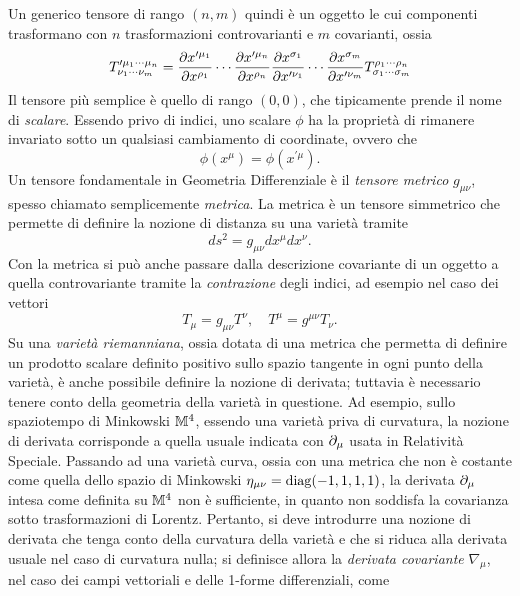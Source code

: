 Un generico tensore di rango $(n,m)$ quindi è un oggetto le cui componenti trasformano con $n$ trasformazioni controvarianti e $m$ covarianti, ossia 
\begin{equation}
    T^{\prime\mu_1\cdots\mu_n}_{\nu_1\cdots\nu_m} = \frac{\partial x^{\prime\mu_1}}{\partial x^{\rho_1}}\cdots\frac{\partial x^{\prime\mu_n}}{\partial x^{\rho_n}}\frac{\partial x^{\sigma_1}}{\partial x^{\prime\nu_1}}\cdots \frac{\partial x^{\sigma_m}}{\partial x^{\prime\nu_m}}T^{\rho_1\cdots\rho_n}_{\sigma_1\cdots\sigma_m}
\end{equation}
Il tensore più semplice è quello di rango $(0,0)$, che tipicamente prende il nome di \emph{scalare}. Essendo privo di indici, uno scalare $\phi$ ha la proprietà di rimanere invariato sotto un qualsiasi cambiamento di coordinate, ovvero che 
\begin{equation}
    \phi(x^\mu) = \phi(x^{\prime\mu}).
\end{equation}
Un tensore fondamentale in Geometria Differenziale è il \emph{tensore metrico} $g_{\mu\nu}$, spesso chiamato semplicemente \emph{metrica}. La metrica è un tensore simmetrico che permette di definire la nozione di distanza su una varietà tramite
\begin{equation}
    ds^2 = g_{\mu\nu}dx^\mu dx^\nu.
\end{equation}
Con la metrica si può anche passare dalla descrizione covariante di un oggetto a quella controvariante tramite la \emph{contrazione} degli indici, ad esempio nel caso dei vettori
\begin{equation}
    T_\mu = g_{\mu\nu}T^\nu,\quad T^\mu = g^{\mu\nu}T_\nu.
\end{equation}
Su una \emph{varietà riemanniana}, ossia dotata di una metrica che permetta di definire un prodotto scalare definito positivo sullo spazio tangente in ogni punto della varietà, è anche possibile definire la nozione di derivata; tuttavia è necessario tenere conto della geometria della varietà in questione. Ad esempio, sullo spaziotempo di Minkowski $\mathbb{M}^4$, essendo una varietà priva di curvatura, la nozione di derivata corrisponde a quella usuale indicata con $\partial_\mu$ usata in Relatività Speciale. Passando ad una varietà curva, ossia con una metrica che non è costante come quella dello spazio di Minkowski $\eta_{\mu\nu} = \mathrm{diag}{(-1,1,1,1)}$, la derivata $\partial_\mu$ intesa come definita su $\mathbb{M}^4$ non è sufficiente, in quanto non soddisfa la covarianza sotto trasformazioni di Lorentz. Pertanto, si deve introdurre una nozione di derivata che tenga conto della curvatura della varietà e che si riduca alla derivata usuale nel caso di curvatura nulla; si definisce allora la \emph{derivata covariante} $\nabla_\mu$, nel caso dei campi vettoriali e delle 1-forme differenziali, come 
